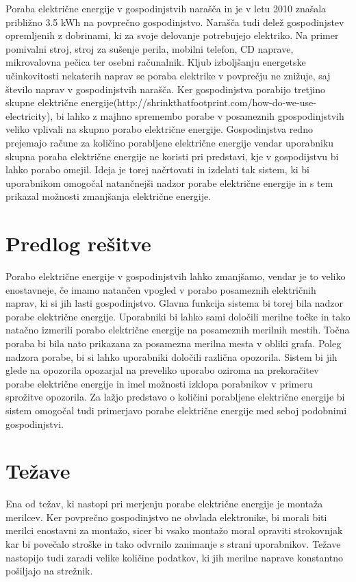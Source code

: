 \documentclass[12pt,a4paper,titlepage,openany]{report}
\begin{document}
Poraba električne energije v gospodinjstvih narašča in je v letu 2010 znašala približno 3.5 kWh na povprečno gospodinjstvo. Narašča tudi delež gospodinjstev opremljenih z dobrinami, ki za svoje delovanje potrebujejo elektriko. Na primer pomivalni stroj, stroj za sušenje perila, mobilni telefon, CD naprave, mikrovalovna pečica ter osebni računalnik. Kljub izboljšanju energetske učinkovitosti nekaterih naprav se poraba elektrike v povprečju ne znižuje, saj število naprav v gospodinjstvih narašča. Ker gospodinjstva porabijo tretjino skupne električne energije(http://shrinkthatfootprint.com/how-do-we-use-electricity), bi lahko z majhno spremembo porabe v posameznih gpospodinjstvih veliko vplivali na skupno porabo električne energije. Gospodinjstva redno prejemajo račune za količino porabljene električne energije vendar uporabniku skupna poraba električne energije ne koristi pri predstavi, kje v gospodijstvu bi lahko porabo omejil. Ideja je torej načrtovati in izdelati tak sistem, ki bi uporabnikom omogočal natančnejši nadzor porabe električne energije in s tem prikazal možnosti zmanjšanja električne energije.

\section{Predlog rešitve}
\thispagestyle{fancy}


Porabo električne energije v gospodinjstvih lahko zmanjšamo, vendar je to veliko enostavneje, če imamo natančen vpogled v porabo posameznih električnih naprav, ki si jih lasti gospodinjstvo. Glavna funkcija sistema bi torej bila nadzor porabe električne energije. Uporabniki bi lahko sami določili merilne točke in tako natačno izmerili porabo električne energije na posameznih merilnih mestih. Točna poraba bi bila nato prikazana za posamezna merilna mesta v obliki grafa. Poleg nadzora porabe, bi si lahko uporabniki določili različna opozorila. Sistem bi jih glede na opozorila opozarjal na preveliko uporabo oziroma na prekoračitev porabe električne energije in imel možnosti izklopa porabnikov v primeru sprožitve opozorila. Za lažjo predstavo o količini porabljene električne energije bi sistem omogočal tudi primerjavo porabe električne energije med seboj podobnimi gospodinjstvi.

\section{Težave}
\thispagestyle{fancy}

Ena od težav, ki nastopi pri merjenju porabe električne energije je montaža merilcev. Ker povprečno gospodinjstvo ne obvlada elektronike, bi morali biti merilci enostavni za montažo, sicer bi vsako montažo moral opraviti strokovnjak kar bi povečalo stroške in tako odvrnilo zanimanje s strani uporabnikov. Težave nastopijo tudi zaradi velike količine podatkov, ki jih merilne naprave konstantno pošiljajo na strežnik. 
\end{document}
